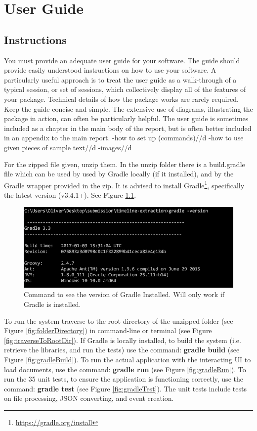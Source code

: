 \chapter{User Guide}
\section{Instructions}
You must provide an adequate user guide for your software. The guide should provide easily understood instructions on how to use your software. A particularly useful approach is to treat the user guide as a walk-through of a typical session, or set of sessions, which collectively display all of the features of your package. Technical details of how the package works are rarely required. Keep the guide concise and simple. The extensive use of diagrams, illustrating the package in action, can often be particularly helpful. The user guide is sometimes included as a chapter in the main body of the report, but is often better included in an appendix to the main report.
-how to set up (commands)//d
-how to use given pieces of sample text//d
-images//d

\par For the zipped file given, unzip them. In the unzip folder there is a build.gradle file which can be used by used by Gradle locally (if it installed), and by the Gradle wrapper provided in the zip. It is advised to install Gradle\footnote{\url{https://gradle.org/install}}, specifically the latest version (v3.4.1+). See Figure \ref{fig:gradleVersion}.

\begin{figure}[H]
\caption{Command to see the version of Gradle Installed. Will only work if Gradle is installed.}
\label{fig:gradleVersion}
\includegraphics{gradleVersion.PNG}
\centering
\end{figure}


\par To run the system traverse to the root directory of the unzipped folder (see Figure \ref{fig:folderDirectory}) in command-line or terminal (see Figure \ref{fig:traverseToRootDir}). If Gradle is locally installed, to build the system (i.e. retrieve the libraries, and run the tests) use the command: \textbf{gradle build} (see Figure \ref{fig:gradleBuild}). To run the actual application with the interacting UI to load documents, use the command: \textbf{gradle run} (see Figure \ref{fig:gradleRun}). To run the 35 unit tests, to ensure the application is functioning correctly, use the command: \textbf{gradle test} (see Figure \ref{fig:gradleTest}). The unit tests include tests on file processing, JSON converting, and event creation.

